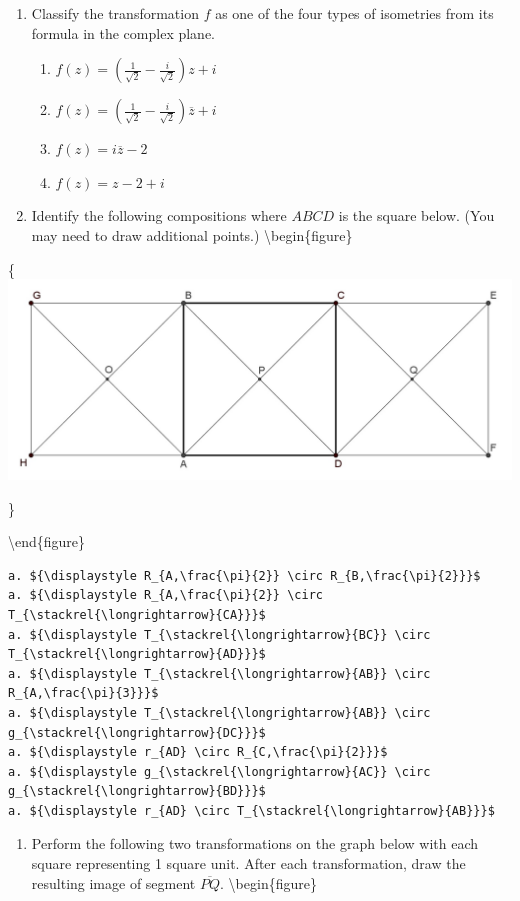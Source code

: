 \documentclass[
]{book}
\providecommand{\tightlist}{%
  \setlength{\itemsep}{0pt}\setlength{\parskip}{0pt}}
\theoremstyle{definition}
\theoremstyle{definition}
\theoremstyle{definition}
\theoremstyle{definition}
\theoremstyle{remark}
\begin{document}
\begin{enumerate}
\def\labelenumi{\arabic{enumi}.}
\item
  Classify the transformation \(f\) as one of the four types of isometries from its formula in the complex plane.

  \begin{enumerate}
  \def\labelenumii{\alph{enumii}.}
  \tightlist
  \item
    \(\displaystyle{f(z)=\left( \frac{1}{\sqrt{2}} - \frac{i}{\sqrt{2}} \right) z +i}\)
  \item
    \(\displaystyle{f(z)=\left( \frac{1}{\sqrt{2}} - \frac{i}{\sqrt{2}} \right) \overline{z} +i}\)
  \item
    \(\displaystyle{f(z)=i\overline{z}-2}\)
  \item
    \(\displaystyle{f(z)=z-2+i}\)
  \end{enumerate}
\item
  Identify the following compositions where \(ABCD\) is the square below. (You may need to draw additional points.)
  \textbackslash begin\{figure\}
\end{enumerate}

\{\centering \includegraphics[width=0.35\linewidth]{images/transformationgraph}

\}

\textbackslash end\{figure\}

\begin{verbatim}
a. ${\displaystyle R_{A,\frac{\pi}{2}} \circ R_{B,\frac{\pi}{2}}}$
a. ${\displaystyle R_{A,\frac{\pi}{2}} \circ T_{\stackrel{\longrightarrow}{CA}}}$
a. ${\displaystyle T_{\stackrel{\longrightarrow}{BC}} \circ T_{\stackrel{\longrightarrow}{AD}}}$
a. ${\displaystyle T_{\stackrel{\longrightarrow}{AB}} \circ R_{A,\frac{\pi}{3}}}$
a. ${\displaystyle T_{\stackrel{\longrightarrow}{AB}} \circ g_{\stackrel{\longrightarrow}{DC}}}$
a. ${\displaystyle r_{AD} \circ R_{C,\frac{\pi}{2}}}$
a. ${\displaystyle g_{\stackrel{\longrightarrow}{AC}} \circ g_{\stackrel{\longrightarrow}{BD}}}$
a. ${\displaystyle r_{AD} \circ T_{\stackrel{\longrightarrow}{AB}}}$
\end{verbatim}

\begin{enumerate}
\def\labelenumi{\arabic{enumi}.}
\tightlist
\item
  Perform the following two transformations on the graph below with each square representing 1 square unit. After each transformation, draw the resulting image of segment \(\overline{PQ}\).
  \textbackslash begin\{figure\}
\end{enumerate}
\end{document}

